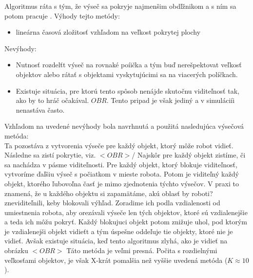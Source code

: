 Algoritmus ráta s tým, že výseč sa pokryje najmenšim obdľžnikom a s ním sa potom pracuje .%
Výhody tejto metódy:
\begin{itemize}
\item lineárna časová zložitosť vzhľadom na veľkost pokrytej plochy
\end{itemize}
Nevýhody:
\begin{itemize}
\item Nutnosť rozdelťt výseč na rovnaké poíička a tým buď nerešpektovat veľkosť objektov alebo rátať s objektami vyskytujúcimi sa na viacerých políčkach.
\item Existuje situácia, pre ktorú tento spôsob nenájde skutočnu viditeľnosť tak, ako by to hráč očakával. $OBR$. Tento pripad je však jediný a v simuláciíi nenastáva často.
\end{itemize}
Vzhľadom na uvedené nevýhody bola navrhnutá a použitá nasledujúca výsečová metóda:\\
Ta pozostáva z vytvorenia výseče pre každý objekt, ktorý môže robot vidieť. Následne sa zistí pokrytie, viz.  $<OBR>$/ Najskôr pre každý objekt zistíme, či sa nachádza v pásme viditeľnosti. Pre každý objekt, ktorý blokuje viditeľnosť, vytvoríme ďaľšiu výseč s počiatkom v mieste robota. Potom je viditeľný každý objekt, ktorého ľubovoľna časť je mimo zjednotenia týchto výsečov. V praxi to znamená, že u každého objektu si zapamätáme, akú oblasť by roboti?zneviditeľnili, keby blokovali výhľad. Zoradime ich podla vzdialenosti od umiestnenia robota, aby orezávali výseče len tých objektov, ktoré sú vzdialenejšie a teda ich môžu pokryť. Každý blokujuci objekt potom znižuje uhol, pod ktorým je vzdialenejši objekt vidieťt a tým úspešne oddeľuje tie objekty, ktoré nie je vidieť. Avšak existuje situácia, keď tento algoritmus zlyhá, ako je vidieť na obrázku $<OBR>$ Táto metóda je veľmi presná. Počita s rozdielnými veľkosťami objektov, je však X-krát pomalšia než vyššie uvedená metóda ($K \approx 10$).
